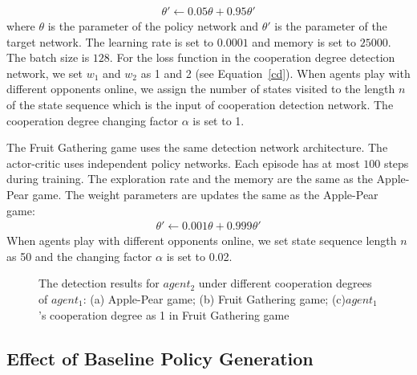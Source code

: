 \documentclass{article}
\begin{document}
\begin{eqnarray}
\theta' \leftarrow 0.05\theta + 0.95\theta'
\end{eqnarray}
where $\theta$ is the parameter of the policy network and $\theta'$ is the parameter of the target network. The learning rate is set to $0.0001$ and memory is set to $25000$. The batch size is $128$. For the loss function in the cooperation degree detection network, we set $w_1$ and $w_2$ as 1 and 2 (see Equation~\ref{cd}).
When agents play with different opponents online,
we assign the number of states visited to the length $n$ of
the state sequence which is the input of cooperation detection network.
The cooperation degree changing factor $\alpha$ is set to 1.

The Fruit Gathering game uses the same detection network architecture. The actor-critic uses independent policy networks. Each episode has at most $100$ steps during training. The exploration rate and the memory are the same as the Apple-Pear game. The weight parameters are updates the same as the Apple-Pear game:
\begin{eqnarray}
\theta' \leftarrow 0.001\theta + 0.999\theta'
\end{eqnarray}
When agents play with different opponents online, we set state sequence length $n$ as 50 and the changing factor $\alpha$ is set to 0.02.


\begin{figure*}[htbp]
\caption{ The detection results for $agent_2$ under different cooperation degrees of $agent_1$: (a) Apple-Pear game; (b) Fruit Gathering game; (c)$agent_1$'s cooperation degree as 1 in Fruit Gathering game}
\label{detectionresult}
\end{figure*}

\subsection{Effect of Baseline Policy Generation}
\end{document}
